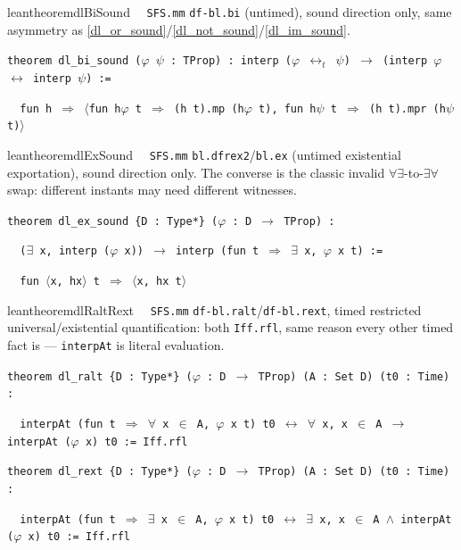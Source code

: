 \begin{restatable}{leantheorem}{dlBiSound}~~ \texttt{SFS.mm} \texttt{df-bl.bi} (untimed), sound direction only, same asymmetry as \ref{dl_or_sound}/\ref{dl_not_sound}/\ref{dl_im_sound}.

\texttt{\textcolor{leancolor}{theorem} \textcolor{leanyellow}{dl\_bi\_sound} ($\varphi$ $\psi$ : TProp) : interp ($\varphi$ $\leftrightarrow_t$ $\psi$) $\to$ (interp $\varphi$ $\leftrightarrow$ interp $\psi$) :=}

\texttt{~~\textcolor{leancolor}{fun} h $\Rightarrow$ $\langle$\textcolor{leancolor}{fun} h$\varphi$ t $\Rightarrow$ (h t).mp (h$\varphi$ t), \textcolor{leancolor}{fun} h$\psi$ t $\Rightarrow$ (h t).mpr (h$\psi$ t)$\rangle$}
\label{dl_bi_sound}
\end{restatable}

\begin{restatable}{leantheorem}{dlExSound}~~ \texttt{SFS.mm} \texttt{bl.dfrex2}/\texttt{bl.ex} (untimed existential exportation), sound direction only. The converse is the classic invalid $\forall\exists$-to-$\exists\forall$ swap: different instants may need different witnesses.

\texttt{\textcolor{leancolor}{theorem} \textcolor{leanyellow}{dl\_ex\_sound} \{D : Type*\} ($\varphi$ : D $\to$ TProp) :}

\texttt{~~($\exists$ x, interp ($\varphi$ x)) $\to$ interp (\textcolor{leancolor}{fun} t $\Rightarrow$ $\exists$ x, $\varphi$ x t) :=}

\texttt{~~\textcolor{leancolor}{fun} $\langle$x, hx$\rangle$ t $\Rightarrow$ $\langle$x, hx t$\rangle$}
\label{dl_ex_sound}
\end{restatable}

\begin{restatable}{leantheorem}{dlRaltRext}~~ \texttt{SFS.mm} \texttt{df-bl.ralt}/\texttt{df-bl.rext}, timed restricted universal/existential quantification: both \texttt{Iff.rfl}, same reason every other timed fact is --- \texttt{interpAt} is literal evaluation.

\texttt{\textcolor{leancolor}{theorem} \textcolor{leanyellow}{dl\_ralt} \{D : Type*\} ($\varphi$ : D $\to$ TProp) (A : Set D) (t0 : Time) :}

\texttt{~~interpAt (\textcolor{leancolor}{fun} t $\Rightarrow$ $\forall$ x $\in$ A, $\varphi$ x t) t0 $\leftrightarrow$ $\forall$ x, x $\in$ A $\to$ interpAt ($\varphi$ x) t0 := Iff.rfl}

\texttt{\textcolor{leancolor}{theorem} \textcolor{leanyellow}{dl\_rext} \{D : Type*\} ($\varphi$ : D $\to$ TProp) (A : Set D) (t0 : Time) :}

\texttt{~~interpAt (\textcolor{leancolor}{fun} t $\Rightarrow$ $\exists$ x $\in$ A, $\varphi$ x t) t0 $\leftrightarrow$ $\exists$ x, x $\in$ A $\wedge$ interpAt ($\varphi$ x) t0 := Iff.rfl}
\label{dl_ralt}
\label{dl_rext}
\end{restatable}

